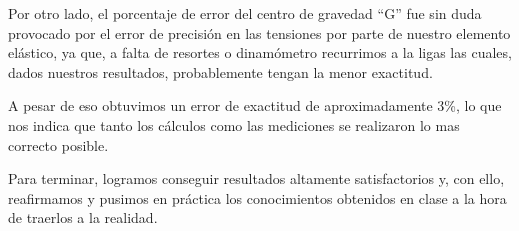 \documentclass[12pt, titlepage]{report}
\begin{document}
    Por otro lado, el porcentaje de error del centro de gravedad ``G'' fue sin duda provocado por el error de precisión en las tensiones por parte de nuestro elemento elástico, ya que, a falta de resortes o dinamómetro recurrimos a la ligas las cuales, dados nuestros resultados, probablemente tengan la menor exactitud.
    
    A pesar de eso obtuvimos un error de exactitud de aproximadamente 3\%, lo que nos indica que tanto los cálculos como las mediciones se realizaron lo mas correcto posible. 
    
    Para terminar, logramos conseguir resultados altamente satisfactorios y, con ello, reafirmamos y pusimos en práctica los conocimientos obtenidos en clase a la hora de traerlos a la realidad.
\end{document}
